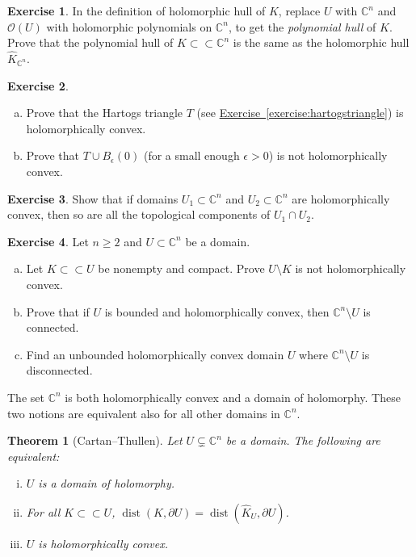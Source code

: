 \documentclass[12pt,openany]{book}
\newcommand{\C}{{\mathbb{C}}}
\newcommand{\sO}{{\mathscr{O}}}
\newcommand{\myindex}[1]{#1\index{#1}}
\theoremstyle{plain}
\newtheorem{thm}{Theorem}[section]
\theoremstyle{remark}
\theoremstyle{definition}
\newenvironment{exbox}{%
    \def\FrameCommand{\vrule width 1pt \relax\hspace{10pt}}%
    \MakeFramed{\advance\hsize-\width\FrameRestore}%
}{%
    \endMakeFramed
}
\newenvironment{exparts}{%
    \leavevmode\begin{enumerate}[a),noitemsep,topsep=0pt,parsep=0pt,partopsep=0pt]
}{%
    \end{enumerate}
}
\theoremstyle{exercise}
\newtheorem{exercise}{Exercise}[section]
\theoremstyle{example}
\newcommand{\exerciseref}[1]{\hyperref[#1]{Exercise~\ref*{#1}}}
\begin{document}
\begin{exbox}
\begin{exercise}
In the definition of holomorphic hull of $K$, replace $U$ with $\C^n$
and $\sO(U)$ with holomorphic polynomials on $\C^n$, to get the
\emph{\myindex{polynomial hull}} of $K$.  Prove that the polynomial hull of
$K \subset \subset \C^n$ is the same as the holomorphic hull $\widehat{K}_{\C^n}$.
\end{exercise}

\begin{exercise}
\begin{exparts}
\item Prove that the Hartogs triangle $T$ (see \exerciseref{exercise:hartogstriangle})
is holomorphically convex.
\item Prove that $T \cup B_{\epsilon}(0)$ (for a small enough $\epsilon > 0$) is
not holomorphically convex.
\end{exparts}
\end{exercise}

\begin{exercise}
Show that if domains $U_1 \subset \C^n$ and $U_2 \subset \C^n$ are
holomorphically convex,
then so are all the topological components of $U_1 \cap U_2$.
\end{exercise}

\begin{exercise}
\pagebreak[2]
Let $n \geq 2$ and $U \subset \C^n$ be a domain.
\begin{exparts}
\item
Let $K \subset \subset U$ be
nonempty and compact. Prove $U \setminus K$ is not
holomorphically convex.
\item
Prove that if
$U$ is bounded and holomorphically convex, then $\C^n \setminus U$ is connected.
\item
Find an unbounded holomorphically convex domain $U$ where
$\C^n \setminus U$ is disconnected.
\end{exparts}
\end{exercise}
\end{exbox}

\pagebreak[2]
The set $\C^n$ is both holomorphically convex and
a domain of holomorphy.  These two notions are equivalent also for all
other domains in $\C^n$.

\begin{thm}[Cartan--Thullen]
\pagebreak[2]
\label{thm:cartthul}
Let $U \subsetneq \C^n$ be a domain.  The following are equivalent:
\begin{enumerate}[(i)]
\item \label{thm:cartthul:domhol}
$U$ is a domain of holomorphy.
\item \label{thm:cartthul:disthull}
For all $K \subset \subset U$,
$\operatorname{dist}(K,\partial U) = \operatorname{dist}(\widehat{K}_U,\partial U)$.
\item \label{thm:cartthul:holconv}
$U$ is holomorphically convex.
\end{enumerate}
\end{thm}
\end{document}
